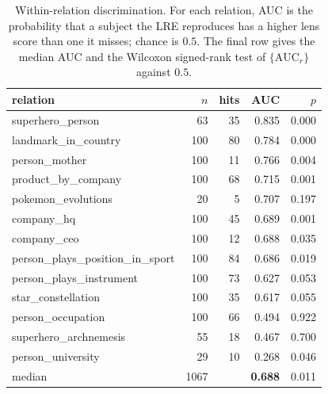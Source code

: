 \begin{table}[t]
\centering\small
\begin{tabular}{@{}lrrrr@{}}
\toprule
relation & $n$ & hits & AUC & $p$ \\
\midrule
superhero\_person & 63 & 35 & 0.835 & 0.000 \\
landmark\_in\_country & 100 & 80 & 0.784 & 0.000 \\
person\_mother & 100 & 11 & 0.766 & 0.004 \\
product\_by\_company & 100 & 68 & 0.715 & 0.001 \\
pokemon\_evolutions & 20 & 5 & 0.707 & 0.197 \\
company\_hq & 100 & 45 & 0.689 & 0.001 \\
company\_ceo & 100 & 12 & 0.688 & 0.035 \\
person\_plays\_position\_in\_sport & 100 & 84 & 0.686 & 0.019 \\
person\_plays\_instrument & 100 & 73 & 0.627 & 0.053 \\
star\_constellation & 100 & 35 & 0.617 & 0.055 \\
person\_occupation & 100 & 66 & 0.494 & 0.922 \\
superhero\_archnemesis & 55 & 18 & 0.467 & 0.700 \\
person\_university & 29 & 10 & 0.268 & 0.046 \\
\midrule
median & 1067 & & \textbf{0.688} & 0.011 \\
\bottomrule
\end{tabular}
\caption{Within-relation discrimination. For each relation, AUC is the
probability that a subject the LRE reproduces has a higher lens score than one
it misses; chance is $0.5$. The final row gives the median AUC and the
Wilcoxon signed-rank test of $\{\mathrm{AUC}_r\}$ against $0.5$.}
\label{tab:subject}
\end{table}
